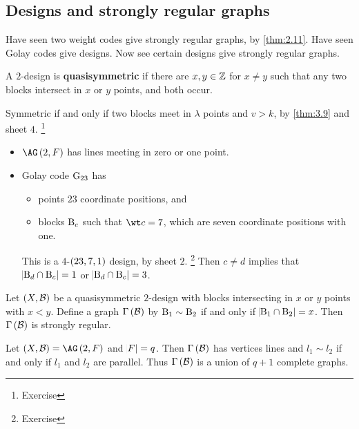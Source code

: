 \pagebreak

\subsection{Designs and strongly regular graphs}

Have seen two weight codes give strongly regular graphs, by \ref{thm:2.11}. Have seen Golay codes give designs. Now see certain designs give strongly regular graphs.


\begin{definition*}
A $ 2 $-design is \textbf{quasisymmetric} if there are $ x, y \in \mathbb{Z} $ for $ x \ne y $ such that any two blocks intersect in $ x $ or $ y $ points, and both occur.
\end{definition*}

\begin{note*}
Symmetric if and only if two blocks meet in $ \lambda $ points and $ v > k $, by \ref{thm:3.9} and sheet $ 4 $. \footnote{Exercise}
\end{note*}

\begin{example*}
\hfill
\begin{itemize}
\item $ \AG\br{2, F} $ has lines meeting in zero or one point.
\item Golay code $ \mathrm{G}_{23} $ has
\begin{itemize}
\item points $ 23 $ coordinate positions, and
\item blocks $ \mathrm{B}_c $ such that $ \wt c = 7 $, which are seven coordinate positions with one.
\end{itemize}
This is a $ 4 $-$ \br{23, 7, 1} $ design, by sheet $ 2 $. \footnote{Exercise} Then $ c \ne d $ implies that $ \abs{\mathrm{B}_d \cap \mathrm{B}_c} = 1 $ or $ \abs{\mathrm{B}_d \cap \mathrm{B}_c} = 3 $.
\end{itemize}
\end{example*}

\begin{theorem}
\label{thm:3.18}
Let $ \br{X, \BBB} $ be a quasisymmetric $ 2 $-design with blocks intersecting in $ x $ or $ y $ points with $ x < y $. Define a graph $ \Gamma\br{\BBB} $ by $ \mathrm{B}_1 \sim \mathrm{B}_2 $ if and only if $ \abs{\mathrm{B}_1 \cap \mathrm{B}_2} = x $. Then $ \Gamma\br{\BBB} $ is strongly regular.
\end{theorem}

\begin{example*}
Let $ \br{X, \BBB} = \AG\br{2, F} $ and $ \abs{F} = q $. Then $ \Gamma\br{\BBB} $ has vertices lines and $ l_1 \sim l_2 $ if and only if $ l_1 $ and $ l_2 $ are parallel. Thus $ \Gamma\br{\BBB} $ is a union of $ q + 1 $ complete graphs.
\end{example*}

